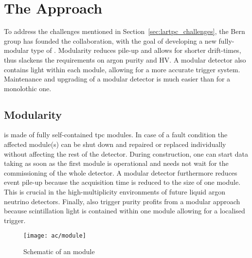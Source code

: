 \section{The \AC{} Approach}
\label{sec:ac_argoncube}

To address the challenges mentioned in Section~\ref{sec:lartpc_challenges}, the Bern group has founded the \AC{} collaboration, with the goal of developing a new fully-modular type of \lartpc{}.
Modularity reduces pile-up and allows for shorter drift-times, thus slackens the requirements on argon purity and HV.
A modular detector also contains light within each module, allowing for a more accurate trigger system.
Maintenance and upgrading of a modular detector is much easier than for a monolothic one.


\subsection{Modularity}
\label{sec:ac_argoncube_mod}

\AC{} is made of fully self-contained \gls{tpc} modules.
In case of a fault condition the affected module(s) can be shut down and repaired or replaced individually without affecting the rest of the detector.
During construction, one can start data taking as soon as the first module is operational and needs not wait for the commissioning of the whole detector.
A modular detector furthermore reduces event pile-up because the acquisition time is reduced to the size of one module.
This is crucial in the high-multiplicity environments of future liquid argon neutrino detectors.
Finally, also trigger purity profits from a modular approach because scintillation light is contained within one module allowing for a localised trigger.

\begin{figure}[htb]
	\centering
	\texttt{[image: ac/module]}
	\caption{Schematic of an \AC{} module}
	\label{fig:ac_module}
\end{figure}

